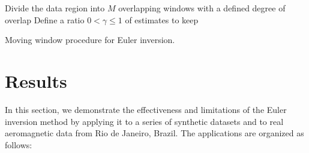 \begin{algorithm}[!h]
  Divide the data region into $M$ overlapping windows with a defined degree of
  overlap
  \;
  Define a ratio $0 < \gamma \le 1$ of estimates to keep
  \;
  \BlankLine
  \caption{Moving window procedure for Euler inversion.}
  \label{alg:window}
\end{algorithm}


\section{Results}

In this section, we demonstrate the effectiveness and limitations of the Euler 
inversion method by applying it to a series of synthetic datasets and to real 
aeromagnetic data from Rio de Janeiro, Brazil.
The applications are organized as follows:

